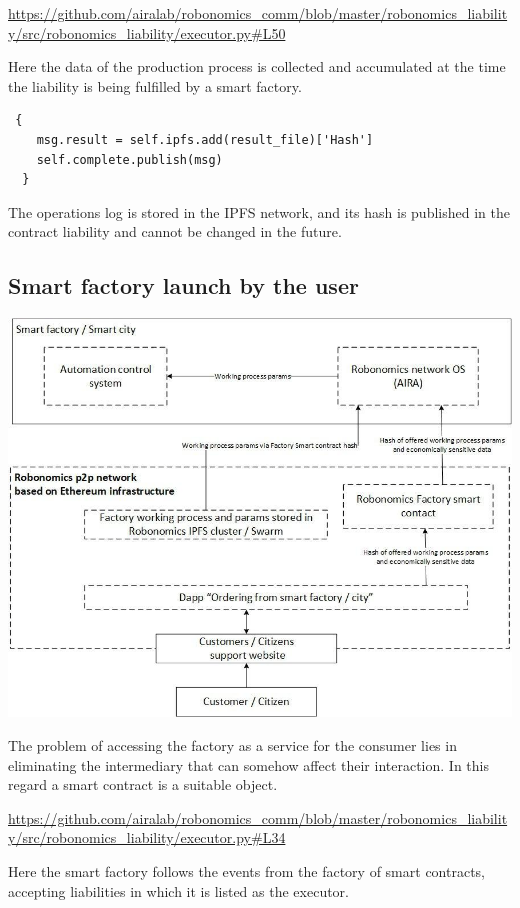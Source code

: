 \documentclass{article}
\begin{document}
\url{https://github.com/airalab/robonomics_comm/blob/master/robonomics_liability/src/robonomics_liability/executor.py#L50}

Here the data of the production process is collected and accumulated at the time the liability is being fulfilled by a smart factory.


\begin{lstlisting}
 {
	msg.result = self.ipfs.add(result_file)['Hash']
	self.complete.publish(msg)
  }
\end{lstlisting}


The operations log is stored in the IPFS network, and its hash is published in the contract liability and cannot be changed in the future.

\subsection{Smart factory launch by the user}

\includegraphics[width=1\textwidth]{app-2.png} 

The problem of accessing the factory as a service for the consumer lies in eliminating the intermediary that can somehow affect their interaction. In this regard a smart contract is a suitable object.

\url{https://github.com/airalab/robonomics_comm/blob/master/robonomics_liability/src/robonomics_liability/executor.py#L34}

Here the smart factory follows the events from the factory of smart contracts, accepting liabilities in which it is listed as the executor.
\end{document}
